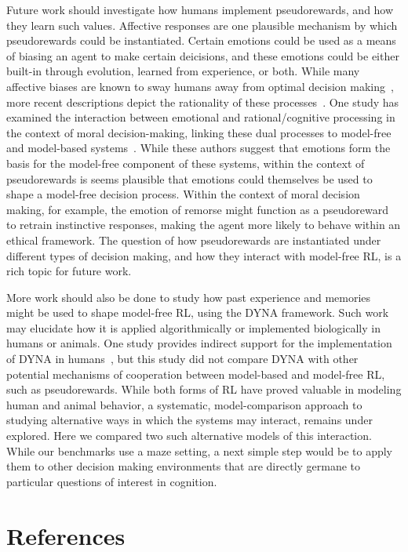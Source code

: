 \documentclass[notitlepage]{article}
\begin{document}
Future work should investigate how humans implement pseudorewards, and how they learn such values. Affective responses are one plausible mechanism by which pseudorewards could be instantiated. Certain emotions could be used as a means of biasing an agent to make certain deicisions, and these emotions could be either built-in through evolution, learned from experience, or both. While many affective biases are known to sway humans away from optimal decision making~\cite{kahneman1979prospect}, more recent descriptions depict the rationality of these processes~\cite{griffiths2008bayesian}. One study has examined the interaction between emotional and rational/cognitive processing in the context of moral decision-making, linking these dual processes to model-free and model-based systems~\cite{cushman2013action}. While these authors suggest that emotions form the basis for the model-free component of these systems, within the context of pseudorewards is seems plausible that emotions could themselves be used to shape a model-free decision process. Within the context of moral decision making, for example, the emotion of remorse might function as a pseudoreward to retrain instinctive responses, making the agent more likely to behave within an ethical framework. The question of how pseudorewards are instantiated under different types of decision making, and how they interact with model-free RL, is a rich topic for future work.

More work should also be done to study how past experience and memories might be used to shape model-free RL, using the DYNA framework. Such work may elucidate how it is applied algorithmically or implemented biologically in humans or animals. One study provides indirect support for the implementation of DYNA in humans~\cite{gershman2014retrospective}, but this study did not compare DYNA with other potential mechanisms of cooperation between model-based and model-free RL, such as pseudorewards. While both forms of RL have proved valuable in modeling human and animal behavior, a systematic, model-comparison approach to studying alternative ways in which the systems may interact, remains under explored. Here we compared two such alternative models of this interaction. While our benchmarks use a maze setting, a next simple step would be to apply them to other decision making environments that are directly germane to particular questions of interest in cognition.

\section*{References}

{}

\end{document}
